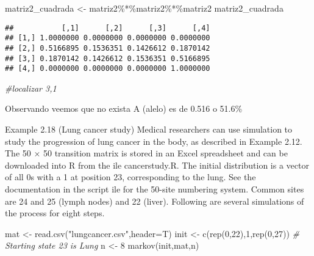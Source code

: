 \documentclass[
]{article}
\newenvironment{Shaded}{\begin{snugshade}}{\end{snugshade}}
\newcommand{\AttributeTok}[1]{\textcolor[rgb]{0.77,0.63,0.00}{#1}}
\newcommand{\CommentTok}[1]{\textcolor[rgb]{0.56,0.35,0.01}{\textit{#1}}}
\newcommand{\DecValTok}[1]{\textcolor[rgb]{0.00,0.00,0.81}{#1}}
\newcommand{\FunctionTok}[1]{\textcolor[rgb]{0.00,0.00,0.00}{#1}}
\newcommand{\NormalTok}[1]{#1}
\newcommand{\OtherTok}[1]{\textcolor[rgb]{0.56,0.35,0.01}{#1}}
\newcommand{\SpecialCharTok}[1]{\textcolor[rgb]{0.00,0.00,0.00}{#1}}
\newcommand{\StringTok}[1]{\textcolor[rgb]{0.31,0.60,0.02}{#1}}
\begin{document}
\begin{Shaded}
\begin{Highlighting}[]
\NormalTok{matriz2\_cuadrada }\OtherTok{\textless{}{-}}\NormalTok{ matriz2}\SpecialCharTok{\%*\%}\NormalTok{matriz2}\SpecialCharTok{\%*\%}\NormalTok{matriz2}
\NormalTok{matriz2\_cuadrada}
\end{Highlighting}
\end{Shaded}

\begin{verbatim}
##           [,1]      [,2]      [,3]      [,4]
## [1,] 1.0000000 0.0000000 0.0000000 0.0000000
## [2,] 0.5166895 0.1536351 0.1426612 0.1870142
## [3,] 0.1870142 0.1426612 0.1536351 0.5166895
## [4,] 0.0000000 0.0000000 0.0000000 1.0000000
\end{verbatim}

\begin{Shaded}
\begin{Highlighting}[]
\CommentTok{\#localizar 3,1}
\end{Highlighting}
\end{Shaded}

Observando veemos que no exista A (alelo) es de 0.516 o 51.6\%

Example 2.18 (Lung cancer study) Medical researchers can use simulation
to study the progression of lung cancer in the body, as described in
Example 2.12. The 50 × 50 transition matrix is stored in an Excel
spreadsheet and can be downloaded into R from the ile cancerstudy.R. The
initial distribution is a vector of all 0s with a 1 at position 23,
corresponding to the lung. See the documentation in the script ile for
the 50-site numbering system. Common sites are 24 and 25 (lymph nodes)
and 22 (liver). Following are several simulations of the process for
eight steps.

\begin{Shaded}
\begin{Highlighting}[]
\NormalTok{mat }\OtherTok{\textless{}{-}} \FunctionTok{read.csv}\NormalTok{(}\StringTok{"lungcancer.csv"}\NormalTok{,}\AttributeTok{header=}\NormalTok{T)}
\NormalTok{init }\OtherTok{\textless{}{-}} \FunctionTok{c}\NormalTok{(}\FunctionTok{rep}\NormalTok{(}\DecValTok{0}\NormalTok{,}\DecValTok{22}\NormalTok{),}\DecValTok{1}\NormalTok{,}\FunctionTok{rep}\NormalTok{(}\DecValTok{0}\NormalTok{,}\DecValTok{27}\NormalTok{)) }\CommentTok{\# Starting state 23 is Lung}
\NormalTok{n }\OtherTok{\textless{}{-}} \DecValTok{8}
\FunctionTok{markov}\NormalTok{(init,mat,n)}
\end{Highlighting}
\end{Shaded}
\end{document}
